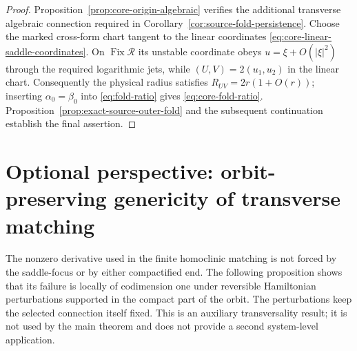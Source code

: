 \documentclass[11pt]{amsart}
\numberwithin{equation}{section}
\theoremstyle{definition}
\theoremstyle{remark}
\newcommand{\cR}{\mathcal R}
\newcommand{\Fix}{\operatorname {Fix}}
\begin{document}
\begin{proof}
Proposition~\ref{prop:core-origin-algebraic} verifies the additional
transverse algebraic connection required in
Corollary~\ref{cor:source-fold-persistence}.  Choose the marked cross-form
chart tangent to the linear
coordinates \eqref{eq:core-linear-saddle-coordinates}.  On $\Fix\cR$ its
unstable coordinate obeys $u=\xi+O(|\xi|^2)$ through the required logarithmic
jets, while $(U,V)=2(u_1,u_2)$ in the linear chart.  Consequently the
physical radius satisfies $R_{UV}=2r(1+O(r))$; inserting
$\alpha_0=\beta_0$ into \eqref{eq:fold-ratio} gives
\eqref{eq:core-fold-ratio}.  Proposition~\ref{prop:exact-source-outer-fold}
and the subsequent continuation establish the final assertion.
\end{proof}

\section{Optional perspective: orbit-preserving genericity of transverse matching}
\label{sec:matching-genericity}

The nonzero derivative used in the finite homoclinic matching is not
forced by the saddle-focus or by either compactified end.  The following
proposition shows that its failure is locally of codimension one under
reversible Hamiltonian perturbations supported in the compact part of the
orbit.  The perturbations keep the selected connection itself fixed.  This
is an auxiliary transversality result; it is not used by the main theorem
and does not provide a second system-level application.
\end{document}
